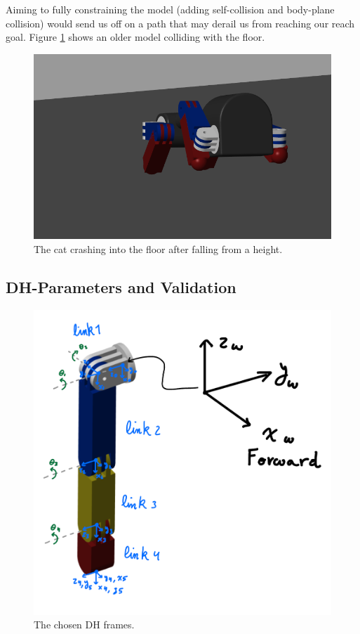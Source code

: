 \documentclass[letterpaper, 10 pt, conference]{ieeeconf}  %
\begin{document}
Aiming to fully constraining the model (adding self-collision and body-plane collision) would send us off on a path that may derail us from reaching our reach goal. Figure \ref{fig:collision} shows an older model colliding with the floor.
\begin{figure}[thpb]
    \parbox{\linewidth}{\includegraphics[width=\linewidth]{ContactModel.png}}
    \caption{The cat crashing into the floor after falling from a height.}
    \label{fig:collision}
\end{figure}

\subsection{DH-Parameters and Validation} \label{sec:dhparams}
\begin{figure}[thpb]
    \parbox{\linewidth}{\includegraphics[width=\linewidth]{dhframes.png}}
    \caption{The chosen DH frames.}
    \label{fig:dhframes}
\end{figure}
\end{document}
